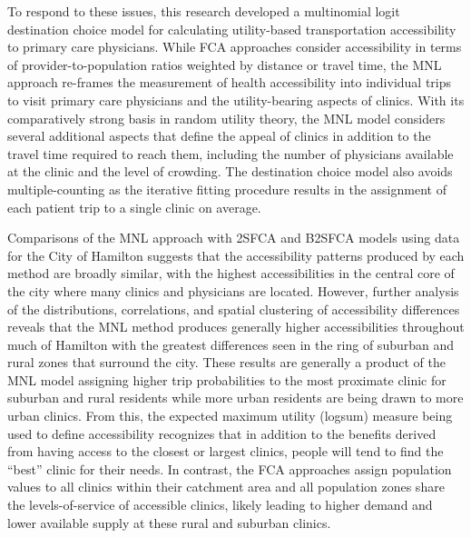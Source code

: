 \documentclass[]{elsarticle} %
\begin{document}
To respond to these issues, this research developed a multinomial logit
destination choice model for calculating utility-based transportation
accessibility to primary care physicians. While FCA approaches consider
accessibility in terms of provider-to-population ratios weighted by
distance or travel time, the MNL approach re-frames the measurement of
health accessibility into individual trips to visit primary care
physicians and the utility-bearing aspects of clinics. With its
comparatively strong basis in random utility theory, the MNL model
considers several additional aspects that define the appeal of clinics
in addition to the travel time required to reach them, including the
number of physicians available at the clinic and the level of crowding.
The destination choice model also avoids multiple-counting as the
iterative fitting procedure results in the assignment of each patient
trip to a single clinic on average.

Comparisons of the MNL approach with 2SFCA and B2SFCA models using data
for the City of Hamilton suggests that the accessibility patterns
produced by each method are broadly similar, with the highest
accessibilities in the central core of the city where many clinics and
physicians are located. However, further analysis of the distributions,
correlations, and spatial clustering of accessibility differences
reveals that the MNL method produces generally higher accessibilities
throughout much of Hamilton with the greatest differences seen in the
ring of suburban and rural zones that surround the city. These results
are generally a product of the MNL model assigning higher trip
probabilities to the most proximate clinic for suburban and rural
residents while more urban residents are being drawn to more urban
clinics. From this, the expected maximum utility (logsum) measure being
used to define accessibility recognizes that in addition to the benefits
derived from having access to the closest or largest clinics, people
will tend to find the ``best'' clinic for their needs. In contrast, the
FCA approaches assign population values to all clinics within their
catchment area and all population zones share the levels-of-service of
accessible clinics, likely leading to higher demand and lower available
supply at these rural and suburban clinics.
\end{document}
